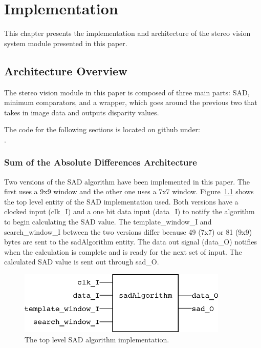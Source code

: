 
\chapter{Implementation}
\label{sec:impl}

This chapter presents the implementation and architecture of the stereo vision system module presented in this paper.

\section{Architecture Overview}

The stereo vision module in this paper is composed of three main parts: SAD, minimum comparators, and a wrapper, which goes around the previous two that takes in image data and outputs disparity values.

The code for the following sections is located on github under:
\\.

\subsection{Sum of the Absolute Differences Architecture}

Two versions of the SAD algorithm have been implemented in this paper. The first uses a 9x9 window and the other one uses a 7x7 window. Figure~\ref{fig:sadAlg_rtl} shows the top level entity of the SAD implementation used. Both versions have a clocked input (clk\_I) and a one bit data input (data\_I) to notify the algorithm to begin calculating the SAD value. The template\_window\_I and search\_window\_I between the two versions differ because 49 (7x7) or 81 (9x9) bytes are sent to the sadAlgorithm entity. The data out signal (data\_O) notifies when the calculation is complete and is ready for the next set of input. The calculated SAD value is sent out through sad\_O.

\begin{figure}
	\begin{center}
		\includegraphics[width=100mm]{figures/sadAlgorithm_rtl.png}
		\captionfonts
		\caption{The top level SAD algorithm implementation.}
		\label{fig:sadAlg_rtl}
	\end{center}
\end{figure}

